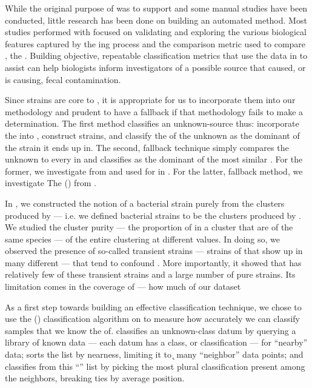 While the original purpose of \cplop{} was to support \mst{} and some manual \mst{} studies have been conducted, little research has been done on building an automated \mst{} method.
Most studies performed with \cplop{} focused on validating and exploring the various biological features captured by the \pyro{}ing process and the comparison metric used to compare \pyros{}, the \pearson{}.
Building objective, repeatable classification metrics that use the data in \cplop{} to assist \mst{} can help biologists inform investigators of a possible source that caused, or is causing, fecal contamination.

Since strains are core to \cplop{}, it is appropriate for us to incorporate them into our \mst{} methodology and prudent to have a fallback if that methodology fails to make a determination.
The first \mst{} method classifies an unknown-source \isol{} thus: incorporate the \isol{} into \cplop{}, construct strains, and classify the \spec{} of the unknown \isol{} as the dominant \spec{} of the strain it ends up in.
The second, fallback technique simply compares the unknown \isol{} to every \isol{} in \cplop{} and classifies as the dominant \spec{} of the most similar \isols{}.
For the former, we investigate \dbscan{} from \cite{johnson2015density} and used for \mst{} in \cite{DBLP:conf/bcb/McGovernJDBKV16}.
For the latter, fallback method, we investigate The \kraplong{} (\krap{}) from \cite{DBLP:conf/bibm/McGovernDKBVG15}.

In \cite{DBLP:conf/bcb/McGovernJDBKV16}, we constructed the notion of a bacterial strain purely from the clusters produced by \dbscan{} --- i.e. we defined bacterial strains to be the clusters produced by \dbscan{}.
We studied the cluster purity --- the proportion of \isols{} in a cluster that are of the same species --- of the entire clustering at different \minneigh{} values.
In doing so, we observed the presence of so-called transient \ecoli{} strains --- strains of \ecoli{} that show up in many different \spec{} --- that tend to confound \mst{}.
More importantly, it showed that \cplop{} has relatively few of these transient strains and a large number of pure strains.
Its limitation comes in the coverage of \cplop{} --- how much of our dataset 



As a first step towards building an effective classification technique, we chose to use the \kNNlong{} (\kNN) classification algorithm on \cplop{} to measure how accurately we can classify samples that we know the \spec{} of.
\kNN{} classifies an unknown-class datum by querying a library of known data --- each datum has a class, or classification --- for ``nearby'' data; sorts the list by nearness, limiting it to \k{} many ``neighbor'' data points; and classifies from this ``\knnlong{}'' list by picking the most plural classification present among the neighbors, breaking ties by average position.

